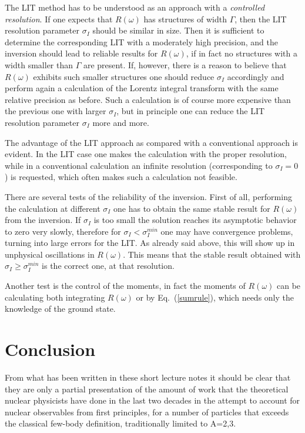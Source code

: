 The LIT method has to be understood as an approach with a {\it controlled resolution}. If
one expects that $R(\omega)$ has structures of  width $\Gamma$, then the LIT resolution
parameter $\sigma_I$ should be similar in size. Then it is sufficient to determine the corresponding LIT 
with a moderately high precision, and the inversion should 
lead to reliable results for $R(\omega)$, if in fact no structures with a width smaller than $\Gamma$
are present. If, however, there is a reason to believe that $R(\omega)$ exhibits
such smaller structures one should
reduce $\sigma_I$ accordingly and perform again a calculation of the Lorentz integral transform  with
the same relative precision as before. Such a calculation is of course more expensive than
the previous one with larger $\sigma_I$, but in principle one can reduce
the LIT resolution parameter $\sigma_I$ more and more. 

The advantage of the LIT approach as compared with a conventional approach is evident. In the
LIT case one makes the calculation with the proper resolution, while in a
conventional calculation an infinite resolution (corresponding to $\sigma_I=0$) is requested, which
often makes such a calculation not feasible.

There are several tests of the reliability of the inversion. First of all, performing the calculation 
at different $\sigma_I$ one has to obtain the same stable result for $R(\omega)$ from the inversion. If $\sigma_I$
is too small the solution reaches its asymptotic behavior to  zero very slowly, 
therefore for $\sigma_I < \sigma_I^{min}$  one may have convergence problems, 
turning into large errors for the LIT. As already said above, this will show up in unphysical oscillations in $R(\omega)$.
This means that the stable result obtained with $\sigma_I \geq \sigma_I^{min}$ is the correct one, at that resolution. 

Another test is the control of the moments, in fact the moments of $R(\omega)$ can be calculating both integrating $R(\omega)$ or 
by Eq.~(\ref{sumrule}),  which needs  only the knowledge of the ground state.

\section{Conclusion}
From  what has been written in these short lecture notes it should be clear that they are only a partial presentation of 
the amount of work that the theoretical nuclear physicists have done in the last two  decades in the attempt to account 
for nuclear observables from first principles, for a number of particles that exceeds the classical few-body definition, 
traditionally limited to A=2,3. 

